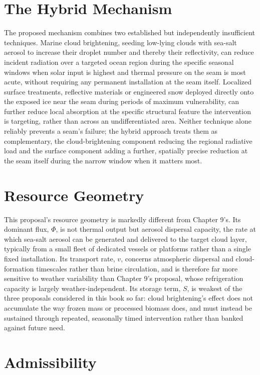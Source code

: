 \documentclass[11pt,oneside]{book}
\begin{document}
\section*{The Hybrid Mechanism}

The proposed mechanism combines two established but independently insufficient techniques. Marine cloud brightening, seeding low-lying clouds with sea-salt aerosol to increase their droplet number and thereby their reflectivity, can reduce incident radiation over a targeted ocean region during the specific seasonal windows when solar input is highest and thermal pressure on the seam is most acute, without requiring any permanent installation at the seam itself. Localized surface treatments, reflective materials or engineered snow deployed directly onto the exposed ice near the seam during periods of maximum vulnerability, can further reduce local absorption at the specific structural feature the intervention is targeting, rather than across an undifferentiated area. Neither technique alone reliably prevents a seam's failure; the hybrid approach treats them as complementary, the cloud-brightening component reducing the regional radiative load and the surface component adding a further, spatially precise reduction at the seam itself during the narrow window when it matters most.

\section*{Resource Geometry}

This proposal's resource geometry is markedly different from Chapter 9's. Its dominant flux, $\Phi$, is not thermal output but aerosol dispersal capacity, the rate at which sea-salt aerosol can be generated and delivered to the target cloud layer, typically from a small fleet of dedicated vessels or platforms rather than a single fixed installation. Its transport rate, $v$, concerns atmospheric dispersal and cloud-formation timescales rather than brine circulation, and is therefore far more sensitive to weather variability than Chapter 9's proposal, whose refrigeration capacity is largely weather-independent. Its storage term, $S$, is weakest of the three proposals considered in this book so far: cloud brightening's effect does not accumulate the way frozen mass or processed biomass does, and must instead be sustained through repeated, seasonally timed intervention rather than banked against future need.

\section*{Admissibility}
\end{document}
